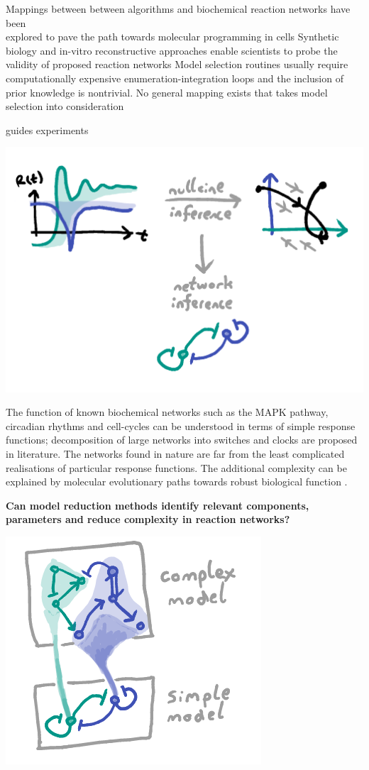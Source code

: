 \documentclass[a0,portrait]{a0poster}
\begin{document}
\begin{itemize}[leftmargin=5cm]
	\up Mappings between between algorithms and biochemical reaction networks have been\\
	explored to pave the path towards molecular programming in cells \cite{Dalchau2018ComputingClocks}
	\up Synthetic biology and in-vitro reconstructive approaches \cite{Loose2011MinMinE}
	enable scientists to probe the validity of proposed reaction networks
	\down Model selection routines \cite{Mangan2017ModelCriteria} usually require computationally expensive enumeration-integration loops and the inclusion of prior knowledge is nontrivial.
	\down No general mapping exists that takes model selection into consideration
\end{itemize}
guides experiments
\begin{center}
\includegraphics[width=0.2\linewidth]{inference}
\end{center}\noindent
The function of known biochemical networks such as the MAPK pathway,
circadian rhythms and cell-cycles can be understood in terms of simple
response functions; decomposition of large networks into switches and
clocks are proposed in literature.
\medbreak\medbreak\noindent
The networks found in nature are far from the least complicated realisations
of particular response functions. The additional complexity can be
explained by molecular evolutionary paths towards robust biological function
\cite{Daniels2008SloppinessBiology}.
\medbreak
\begin{tcolorbox}[boxrule=2pt,arc=3.4pt,boxsep=2mm]
\begin{center}\color{DarkRed}
\textbf{Can model reduction methods \cite{Cardelli2016NoiseSwitches} identify relevant components,
parameters and reduce complexity in reaction networks?}
\end{center}
\end{tcolorbox}
\begin{center}
\includegraphics[width=0.9\linewidth]{reduction}
\end{center}
\end{document}
